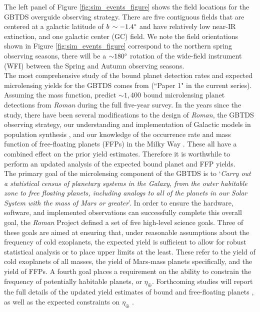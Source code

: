 \documentclass[twocolumn]{aastex631}
\begin{document}
The left panel of Figure \ref{fig:sim_events_figure} shows the field locations for the GBTDS overguide observing strategy. There are five contiguous fields that are centered at a galactic latitude of $b\, \sim -1.4\degree$ and have relatively low near-IR extinction, and one galactic center (GC) field. We note the field orientations shown in Figure \ref{fig:sim_events_figure} correspond to the northern spring observing seasons, there will be a ${\sim}180\degree$ rotation of the wide-field instrument (WFI) between the Spring and Autumn observing seasons.\\
\indent The most comprehensive study of the bound planet detection rates and expected microlensing yields for the GBTDS comes from \cite{penny19} (``Paper 1" in the current series). Assuming the \cite{cassan:2012a} mass function, \cite{penny19} predict ${\sim}1,400$ bound microlensing planet detections from \textit{Roman} during the full five-year survey. In the years since the \cite{penny19} study, there have been several modifications to the design of \textit{Roman}, the GBTDS observing strategy, our understanding and implementation of Galactic models in population synthesis \citep{kluter:2025a}, and our knowledge of the occurrence rate and mass function of free-floating planets (FFPs) in the Milky Way \citep{gould:2022b, sumi:2023a}. These all have a combined effect on the prior yield estimates. Therefore it is worthwhile to perform an updated analysis of the expected bound planet and FFP yields. \\
\indent The primary goal of the microlensing component of the GBTDS is to `\textit{Carry out a statistical census of planetary systems in the Galaxy, from the outer habitable zone to free floating planets, including analogs to all of the planets in our Solar System with the mass of Mars or greater}'.  In order to ensure the hardware, software, and implemented observations can successfully complete this overall goal, the \textit{Roman} Project defined a set of five high-level science goals.  Three of these goals are aimed at ensuring that, under reasonable assumptions about the frequency of cold exoplanets, the expected yield is sufficient to allow for robust statistical analysis or to place upper limits at the least.  These refer to the yield of cold exoplanets of all masses, the yield of Mars-mass planets specifically, and the yield of FFPs. A fourth goal places a requirement on the ability to constrain the frequency of potentially habitable planets, or $\eta_{\oplus}$.  Forthcoming studies will report the full details of the updated yield estimates of bound and free-floating  planets \citep{zohrabi:inprep}, as well as the expected constraints on $\eta_{\oplus}$ \citep{crisp:inprep}.\\
\end{document}
